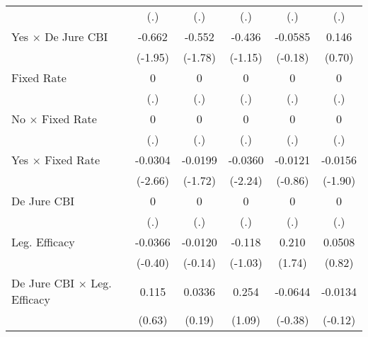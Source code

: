 \begin{table}[htbp]
\begin{tabular}{l*{5}{c}}
                                        &      (.)         &      (.)         &      (.)         &      (.)         &      (.)         \\
\addlinespace
Yes $\times$ De Jure CBI                &   -0.662         &   -0.552         &   -0.436         &  -0.0585         &    0.146         \\
                                        &  (-1.95)         &  (-1.78)         &  (-1.15)         &  (-0.18)         &   (0.70)         \\
\addlinespace
Fixed Rate                              &        0         &        0         &        0         &        0         &        0         \\
                                        &      (.)         &      (.)         &      (.)         &      (.)         &      (.)         \\
\addlinespace
No $\times$ Fixed Rate                  &        0         &        0         &        0         &        0         &        0         \\
                                        &      (.)         &      (.)         &      (.)         &      (.)         &      (.)         \\
\addlinespace
Yes $\times$ Fixed Rate                 &  -0.0304\sym{**} &  -0.0199         &  -0.0360\sym{*}  &  -0.0121         &  -0.0156         \\
                                        &  (-2.66)         &  (-1.72)         &  (-2.24)         &  (-0.86)         &  (-1.90)         \\
\addlinespace
De Jure CBI                             &        0         &        0         &        0         &        0         &        0         \\
                                        &      (.)         &      (.)         &      (.)         &      (.)         &      (.)         \\
\addlinespace
Leg. Efficacy                           &  -0.0366         &  -0.0120         &   -0.118         &    0.210         &   0.0508         \\
                                        &  (-0.40)         &  (-0.14)         &  (-1.03)         &   (1.74)         &   (0.82)         \\
\addlinespace
De Jure CBI $\times$ Leg. Efficacy      &    0.115         &   0.0336         &    0.254         &  -0.0644         &  -0.0134         \\
                                        &   (0.63)         &   (0.19)         &   (1.09)         &  (-0.38)         &  (-0.12)         \\

\end{tabular}
\end{table}
